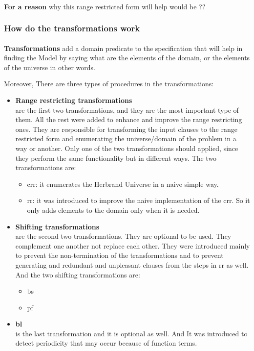 		
		\paragraph{} 
		\textbf{For a reason} why this range restricted form will help would be ??

	 \subsubsection{How do the transformations work}
	 
		\paragraph{} 
		\textbf{Transformations} add a domain predicate to the specification that will help in finding the Model by saying what are the elements of the domain, or the elements of the universe in other words.\par
		Moreover, There are three types of procedures in the transformations:	
		\begin{itemize}
			\item \textbf{Range restricting transformations}
			 \hfill \\ are the first two transformations, and they are the most important type of them. All the rest were added to enhance and improve the range restricting ones. They are responsible for transforming the input clauses to the range restricted form and enumerating the universe/domain of the problem in a way or another. Only one of the two transformations should applied, since they perform the same functionality but in different ways. The two transformations are:
			 	\begin{itemize}
			 		\item \ac{crr}: it enumerates the Herbrand Universe in a naive simple way. 
			 		\item \ac{rr}: it was introduced to improve the naive implementation of the \ac{crr}. So it only adds elements to the domain only when it is needed.
			 	\end{itemize}
			
			\item \textbf{Shifting transformations}
			 \hfill \\ are the second two transformations. They are optional to be used. They complement one another not replace each other. They were introduced mainly to prevent the non-termination of the transformations and to prevent generating and redundant and unpleasant clauses from the steps in \ac{rr} as well. And the two shifting transformations are:
			 	\begin{itemize}
			 		\item \ac{bs}
			 		\item \ac{pf}
			 	\end{itemize}
			
			\item \textbf{\ac{bl}}
			 \hfill \\ is the last transformation and it is optional as well. And It was introduced to detect periodicity that may occur because of function terms. 
		\end{itemize}
		
